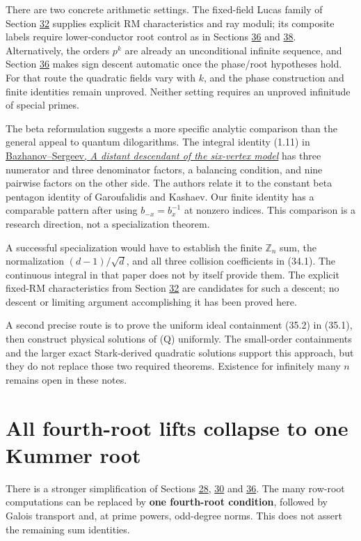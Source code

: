 \documentclass[11pt,reqno]{amsart}
\theoremstyle{plain}
\begin{document}
There are two concrete arithmetic settings. The fixed-field Lucas
family of Section \hyperref[sec:32]{32} supplies explicit RM characteristics and ray
moduli; its composite labels require lower-conductor root control as
in Sections \hyperref[sec:36]{36} and \hyperref[sec:38]{38}. Alternatively, the orders \(p^k\) are already an
unconditional infinite sequence, and Section \hyperref[sec:36]{36} makes sign descent
automatic once the phase/root hypotheses hold. For that route the
quadratic fields vary with \(k\), and the phase construction and
finite identities remain unproved. Neither setting requires an
unproved infinitude of special primes.

The beta reformulation suggests a more specific analytic comparison
than the general appeal to quantum dilogarithms. The integral
identity (1.11) in
\href{https://arxiv.org/html/2310.08427v2\#S1.E11}{Bazhanov--Sergeev, \emph{A distant descendant of the six-vertex model}}
has three numerator and three denominator factors, a balancing
condition, and nine pairwise factors on the other side. The authors
relate it to the constant beta pentagon identity of Garoufalidis and
Kashaev. Our finite identity has a comparable pattern after using
\(b_{-x}=b_x^{-1}\) at nonzero indices. This comparison is a
research direction, not a specialization theorem.

A successful specialization would have to establish the finite
\(\mathbb Z_n\) sum, the normalization \((d-1)/\sqrt d\), and
all three collision coefficients in (34.1). The continuous integral
in that paper does not by itself provide them. The explicit fixed-RM
characteristics from Section \hyperref[sec:32]{32} are candidates for such a descent;
no descent or limiting argument accomplishing it has been proved
here.

A second precise route is to prove the uniform ideal containment
(35.2) in (35.1), then construct physical solutions of (Q) uniformly.
The small-order containments and the larger exact Stark-derived
quadratic solutions support this approach, but they do not replace
those two required theorems. Existence for infinitely many \(n\)
remains open in these notes.

\section{All fourth-root lifts collapse to one Kummer root}\label{sec:38}

There is a stronger simplification of Sections \hyperref[sec:28]{28}, \hyperref[sec:30]{30} and \hyperref[sec:36]{36}. The
many row-root computations can be replaced by \textbf{one fourth-root
condition}, followed by Galois transport and, at prime powers,
odd-degree norms. This does not assert the remaining sum identities.
\end{document}
